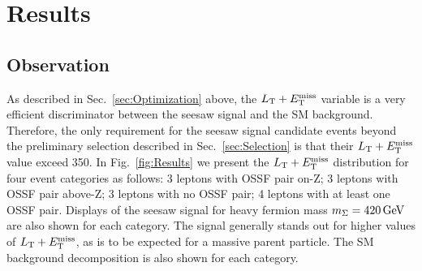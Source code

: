 \chapter{Results}
\label{chap:Results}

\section{Observation}

As described in Sec.~\ref{sec:Optimization} above, the $L_\textrm{T} + E_{\mathrm{T}}^{\text{miss}}$ variable is a very efficient discriminator between the seesaw signal and the SM background. Therefore, the only requirement for the seesaw signal candidate events beyond the preliminary selection described in Sec.~\ref{sec:Selection} is that their $L_\textrm{T} + E_{\mathrm{T}}^{\text{miss}}$ value exceed 350\GeV. In Fig.~\ref{fig:Results} we present the $L_\textrm{T} + E_{\mathrm{T}}^{\text{miss}}$ distribution for four event categories as follows: 3 leptons with OSSF pair on-Z; 3 leptons with OSSF pair above-Z; 3 leptons with no OSSF pair; 4 leptons with at least one OSSF pair. Displays of the seesaw signal for heavy fermion mass $m_\Sigma = 420\,\text{Ge\hspace{-.08em}V}$ are also shown for each category. The signal generally stands out for higher values of $L_\textrm{T} + E_{\mathrm{T}}^{\text{miss}}$, as is to be expected for a massive parent particle. The SM background decomposition is also shown for each category.

